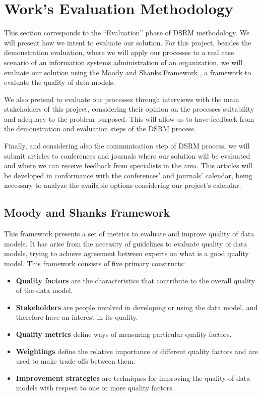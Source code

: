 
% 
% 

\section{Work's Evaluation Methodology}

This section corresponds to the ``Evaluation'' phase of DSRM methodology. We will present how we intent to evaluate our solution. For this project, besides the demonstration evaluation, where we will apply our processes to a real case scenario of an information systems administration of an organization, we will evaluate our solution using the Moody and Shanks Framework \cite{moody2003improving}, a framework to evaluate the quality of data models.\par
We also pretend to evaluate our processes through interviews with the main stakeholders of this project, considering their opinion on the processes suitability and adequacy to the problem purposed. This will allow us to have feedback from the demonstration and evaluation steps of the DSRM process.\par
Finally, and considering also the communication step of DSRM process, we will submit articles to conferences and journals where our solution will be evaluated and where we can receive feedback from specialists in the area. This articles will be developed in conformance with the conferences' and journals' calendar, being necessary to analyze the available options considering our project's calendar.\par

\subsection{Moody and Shanks Framework}

This framework presents a set of metrics to evaluate and improve quality of data models. It has arise from the necessity of guidelines to evaluate quality of data models, trying to achieve agreement between experts on what is a good quality model. This framework consists of five primary constructs:

\begin{itemize}
\item \textbf{Quality factors} are the characteristics that contribute to the overall quality of the data model.
\item \textbf{Stakeholders} are people involved in developing or using the data model, and therefore have an interest in its quality.
\item \textbf{Quality metrics} define ways of measuring particular quality factors.
\item \textbf{Weightings} define the relative importance of different quality factors and are used to make trade-offs between them.
\item \textbf{Improvement strategies} are techniques for improving the quality of data models with respect to one or more quality factors.
\end{itemize}


